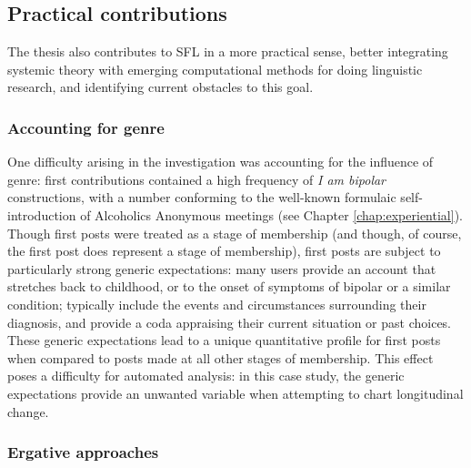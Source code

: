 
\subsection{Practical contributions}

The thesis also contributes to \gls{SFL} in a more practical sense, better integrating systemic theory with emerging computational methods for doing linguistic research, and identifying current obstacles to this goal.

\subsubsection{Accounting for genre}

\noindent One difficulty arising in the investigation was accounting for the influence of genre: first contributions contained a high frequency of \emph{I am bipolar} constructions, with a number conforming to the well\hyp{}known formulaic self\hyp{}introduction of Alcoholics Anonymous meetings (see Chapter \ref{chap:experiential}). Though first \glspl{post} were treated as a stage of membership (and though, of course, the first \gls{post} does represent a stage of membership), first \glspl{post} are subject to particularly strong generic expectations: many users provide an account that stretches back to childhood, or to the onset of symptoms of bipolar or a similar condition;  typically include the events and circumstances surrounding their diagnosis, and provide a coda appraising their current situation or past choices. These generic expectations lead to a unique quantitative profile for first \glspl{post} when compared to \glspl{post} made at all other stages of membership. This effect poses a difficulty for automated analysis: in this case study, the generic expectations provide an unwanted variable when attempting to chart longitudinal change.


\subsubsection{Ergative approaches}

